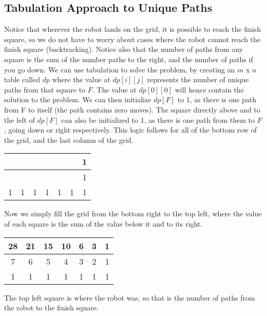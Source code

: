 \subsection{Tabulation Approach to Unique Paths}
Notice that wherever the robot lands on the grid, it is possible to reach the finish square,
so we do not have to worry about cases where the robot cannot reach the finish square (backtracking).
Notice also that the number of paths from any square is the sum of the number paths to the right, and the number of paths if you go down.
We can use tabulation to solve the problem, by creating an $m$ x $n$ table called $dp$ where the value at $dp[i][j]$ represents the number of unique paths from that square to $F$.
The value at $dp[0][0]$ will hence contain the solution to the problem.
We can then initialize $dp[F]$ to 1, as there is one path from F to itself (the path contains zero moves).
The square directly above and to the left of $dp[F]$ can also be initialized to 1, as there is one path from them to $F$, going down or right respectively. This logic follows for all of the bottom row of the grid, and the last column of the grid.

\begin{table}[H]
    \centering
    \begin{tabular}{|c|c|c|c|c|c|c|}
        \hline
         &  &  &  &  &  & 1 \\
        \hline
         &  &  &  &  &  & 1 \\
        \hline
        1 & 1 & 1 & 1 & 1 & 1 & 1 \\
        \hline
    \end{tabular}
\end{table}

Now we simply fill the grid from the bottom right to the top left,
where the value of each square is the sum of the value below it and to its right.

\begin{table}[H]
    \centering
    \begin{tabular}{|c|c|c|c|c|c|c|}
        \hline
        28 & 21 & 15 & 10 & 6 & 3 & 1 \\
        \hline
        7 & 6 & 5 & 4 & 3 & 2 & 1 \\
        \hline
        1 & 1 & 1 & 1 & 1 & 1 & 1 \\
        \hline
    \end{tabular}
\end{table}

The top left square is where the robot was, so that is the number of paths from the robot to the finish square.


